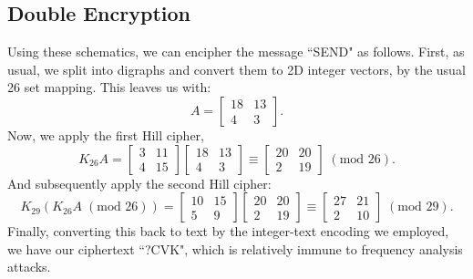 \documentclass{article}
\begin{document}
\subsection{Double Encryption}
Using these schematics, we can encipher the message ``SEND" as follows. First, as usual, we split into digraphs and convert them to 2D integer vectors, by the usual 26 set mapping. This leaves us with:
\[
    A = \begin{bmatrix}
        18 & 13 \\
        4 & 3
    \end{bmatrix}.
\]
Now, we apply the first Hill cipher,
\[
    K_{26} A = \begin{bmatrix}
        3 & 11 \\
        4 & 15
    \end{bmatrix} \begin{bmatrix}
        18 & 13 \\
        4 & 3
    \end{bmatrix} \equiv \begin{bmatrix}
        20 & 20 \\
        2 & 19
    \end{bmatrix} \; (\text{mod } 26).
\]
And subsequently apply the second Hill cipher:
\[
    K_{29} (K_26 A \; (\text{mod } 26)) = \begin{bmatrix}
        10 & 15 \\
        5 & 9
    \end{bmatrix} \begin{bmatrix}
        20 & 20 \\
        2 & 19
    \end{bmatrix} \equiv \begin{bmatrix}
        27 & 21 \\
        2 & 10
    \end{bmatrix} \; (\text{mod } 29).
\]
Finally, converting this back to text by the integer-text encoding we employed, we have our ciphertext ``?CVK", which is relatively immune to frequency analysis attacks.
\end{document}

